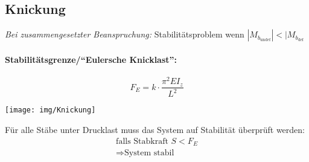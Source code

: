 \documentclass{article}
\begin{document}
\begin{multicols*}{4}
			\subsection{Knickung} %
				\emph{Bei zusammengesetzter Beanspruchung:}
				Stabilitätsproblem wenn $|M_{b_{\text{undef}}}| < |M_{b_{\text{def}}}$
				
				\paragraph{Stabilitätsgrenze/“Eulersche Knicklast”:} %
					\[
						F_E = k \cdot \frac{\pi^2 EI_z}{L^2}
					\]
				
					\begin{center}
						\texttt{[image: img/Knickung]}
					\end{center}
				
					Für alle Stäbe unter Drucklast muss das System auf Stabilität überprüft werden:
					\begin{gather*}
						\text{falls Stabkraft } S < F_E \\
						\Rightarrow \text{System stabil}
					\end{gather*}
	\end{multicols*}
\end{document}
